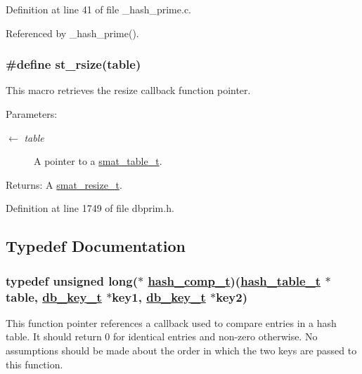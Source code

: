Definition at line 41 of file \_\-hash\_\-prime.c.

Referenced by \_\-hash\_\-prime().\hypertarget{group__dbprim__hash_ga45}{
\subsubsection[st\_\-rsize]{\setlength{\rightskip}{0pt plus 5cm}\#define st\_\-rsize(table)}}
\label{group__dbprim__hash_ga45}


This macro retrieves the resize callback function pointer.

\begin{Desc}
\item[Parameters:]
\begin{description}
\item[\mbox{$\leftarrow$} {\em table}]A pointer to a \hyperlink{group__dbprim__smat_ga0}{smat\_\-table\_\-t}.\end{description}
\end{Desc}
\begin{Desc}
\item[Returns:]A \hyperlink{group__dbprim__smat_ga3}{smat\_\-resize\_\-t}.\end{Desc}


Definition at line 1749 of file dbprim.h.

\subsection{Typedef Documentation}
\hypertarget{group__dbprim__hash_ga5}{
\subsubsection[hash\_\-comp\_\-t]{\setlength{\rightskip}{0pt plus 5cm}typedef unsigned long($\ast$ \hyperlink{group__dbprim__hash_ga5}{hash\_\-comp\_\-t})(\hyperlink{struct__hash__table__s}{hash\_\-table\_\-t} $\ast$table, \hyperlink{struct__db__key__s}{db\_\-key\_\-t} $\ast$key1, \hyperlink{struct__db__key__s}{db\_\-key\_\-t} $\ast$key2)}}
\label{group__dbprim__hash_ga5}


This function pointer references a callback used to compare entries in a hash table. It should return 0 for identical entries and non-zero otherwise. No assumptions should be made about the order in which the two keys are passed to this function.

